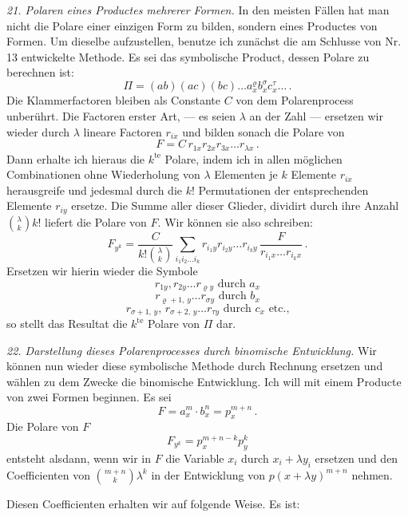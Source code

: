 \documentclass[11pt]{article}
\providecommand{\weberpage}[1]{}
\providecommand{\weq}[2]{\begin{equation}\tag{#1}#2\end{equation}}
\let\Pi\varPi
\begin{document}
\weberpage{24}
\textit{21. Polaren eines Productes mehrerer Formen.} In den meisten Fällen hat man nicht die Polare einer einzigen Form zu bilden, sondern eines Productes von Formen. Um dieselbe aufzustellen, benutze ich zunächst die am Schlusse von Nr. 13 entwickelte Methode. Es sei das symbolische Product, dessen Polare zu berechnen ist:
\[
\Pi = (ab)(ac)(bc)\dots a_x^\varrho b_x^\sigma c_x^\tau \dots\,.
\]
Die Klammerfactoren bleiben als Constante $C$ von dem Polarenprocess unberührt. Die Factoren erster Art, — es seien $\lambda$ an der Zahl — ersetzen wir wieder durch $\lambda$ lineare Factoren $r_{ix}$ und bilden sonach die Polare von
\[
F = C\,r_{1x}r_{2x}r_{3x}\dots r_{\lambda x}\,.
\]
Dann erhalte ich hieraus die $k^{\text{te}}$ Polare, indem ich in allen möglichen Combinationen ohne Wiederholung von $\lambda$ Elementen je $k$ Elemente $r_{ix}$ herausgreife und jedesmal durch die $k!$ Permutationen der entsprechenden Elemente $r_{iy}$ ersetze. Die Summe aller dieser Glieder, dividirt durch ihre Anzahl $\binom{\lambda}{k}k!$ liefert die Polare von $F$. Wir können sie also schreiben:
\weq{I}{F_{y^k} = \frac{C}{k!\binom{\lambda}{k}}\sum_{i_1i_2\dots i_k} r_{i_1y}r_{i_2y}\dots r_{i_ky}\,\frac{F}{r_{i_1x}\dots r_{i_kx}}\,.}
Ersetzen wir hierin wieder die Symbole
\[
r_{1y}, r_{2y}\dots r_{\varrho y} \text{ durch } a_x
\]
\[
r_{\varrho+1,\,y}\dots r_{\sigma y} \text{ durch } b_x
\]
\[
r_{\sigma+1,\,y},\, r_{\sigma+2,\,y}\dots r_{\tau y} \text{ durch } c_x \text{ etc.,}
\]
so stellt das Resultat die $k^{\text{te}}$ Polare von $\Pi$ dar.

\textit{22. Darstellung dieses Polarenprocesses durch binomische Entwicklung.} Wir können nun wieder diese symbolische Methode durch Rechnung ersetzen und wählen zu dem Zwecke die binomische Entwicklung. Ich will mit einem Producte von zwei Formen beginnen. Es sei
\[
F = a_x^m\cdot b_x^n = p_x^{m+n}\,.
\]
Die Polare von $F$
\[
F_{y^k} = p_x^{m+n-k}p_y^k
\]
entsteht alsdann, wenn wir in $F$ die Variable $x_i$ durch $x_i+\lambda y_i$ ersetzen und den Coefficienten von $\binom{m+n}{k}\lambda^k$ in der Entwicklung von $p(x+\lambda y)^{m+n}$ nehmen.

Diesen Coefficienten erhalten wir auf folgende Weise. Es ist:
\end{document}

